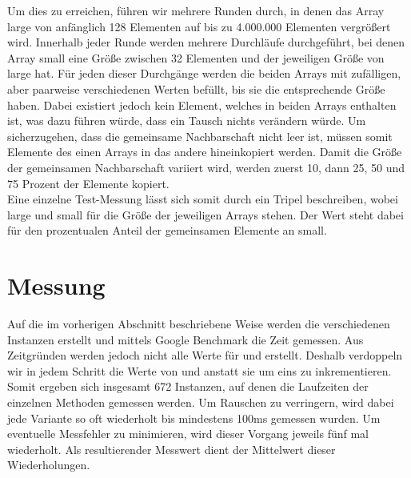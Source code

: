 Um dies zu erreichen, führen wir mehrere Runden durch, in denen das Array large von anfänglich 128
Elementen auf bis zu 4.000.000 Elementen vergrößert wird. Innerhalb jeder Runde werden mehrere Durchläufe 
durchgeführt, bei denen Array small eine Größe zwischen 32 Elementen und der jeweiligen Größe von large hat.
Für jeden dieser Durchgänge werden die beiden Arrays mit zufälligen, aber paarweise verschiedenen
Werten befüllt, bis sie die entsprechende Größe haben. 
Dabei existiert jedoch kein Element, welches in beiden Arrays 
enthalten ist, was dazu führen würde, dass ein \gc{} 
Tausch nichts verändern würde. Um sicherzugehen,
dass die gemeinsame Nachbarschaft nicht leer ist, müssen somit Elemente des einen Arrays 
in das andere hineinkopiert werden. Damit die Größe der gemeinsamen Nachbarschaft
variiert wird, werden zuerst 10, dann 25, 50 und 75 Prozent der Elemente kopiert. 
\\

Eine einzelne Test-Messung lässt sich somit durch ein Tripel \fett{(\la, \sm, \fr)} beschreiben, wobei
large  und small für die Größe der jeweiligen Arrays stehen.
Der Wert \fett{\fr} steht dabei für den prozentualen Anteil der gemeinsamen Elemente an small.






\section{Messung}
Auf die im vorherigen Abschnitt beschriebene Weise werden die verschiedenen Instanzen erstellt und
mittels Google Benchmark die Zeit gemessen. Aus Zeitgründen werden jedoch nicht alle Werte 
für \la{} und \sm{} erstellt. Deshalb verdoppeln wir in jedem Schritt die Werte von \la{} und \sm{,}
anstatt sie um eins zu inkrementieren. Somit ergeben sich insgesamt 672 Instanzen, auf denen die Laufzeiten der 
einzelnen Methoden gemessen werden. 
Um Rauschen zu verringern, wird dabei jede Variante so oft wiederholt
 bis mindestens 100ms gemessen wurden.
Um eventuelle Messfehler zu minimieren, wird
dieser Vorgang 
jeweils fünf mal wiederholt. 
Als resultierender Messwert dient der Mittelwert dieser Wiederholungen.
\\

